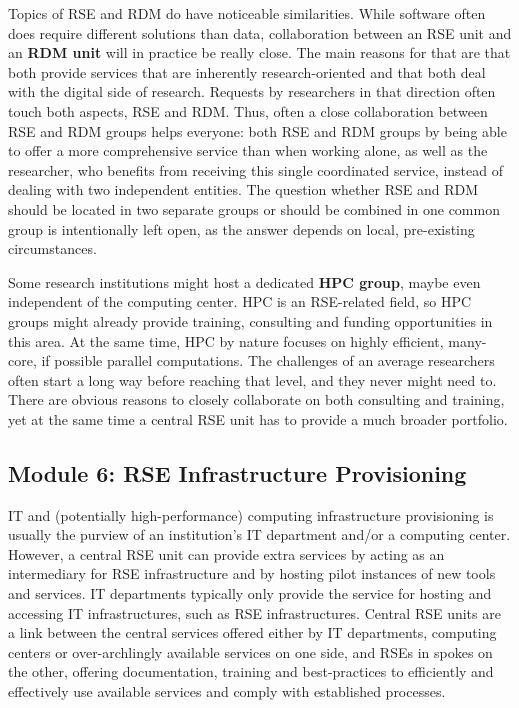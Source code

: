 \documentclass[a4paper]{article}
\begin{document}
Topics of RSE and RDM do have noticeable similarities.
While software often does require different solutions than data, collaboration between an RSE unit and an \textbf{RDM unit} will in practice be really close.
The main reasons for that are that both provide services that are inherently research-oriented and that both deal with the digital side of research.
Requests by researchers in that direction often touch both aspects, RSE and RDM\@.
Thus, often a close collaboration between RSE and RDM groups helps everyone: both RSE and RDM groups by being able to offer a more comprehensive service than when working alone, as well as the researcher, who benefits from receiving this single coordinated service, instead of dealing with two independent entities.
The question whether RSE and RDM should be located in two separate groups or should be combined in one common group is intentionally left open, as the answer depends on local, pre-existing circumstances.

Some research institutions might host a dedicated \textbf{HPC group}, maybe even independent of the computing center.
HPC is an RSE-related field, so HPC groups might already provide training, consulting and funding opportunities in this area.
At the same time, HPC by nature focuses on highly efficient, many-core, if possible parallel computations.
The challenges of an average researchers often start a long way before reaching that level, and they never might need to.
There are obvious reasons to closely collaborate on both consulting and training, yet at the same time a central RSE unit has to provide a much broader portfolio.

\subsection{Module 6: RSE Infrastructure Provisioning}%
\label{sec:infrastructure}

IT and (potentially high-performance) computing infrastructure provisioning is usually the purview of an institution's IT department and/or a computing center.
However, a central RSE unit can provide extra services by acting as an intermediary for RSE infrastructure and by hosting pilot instances of new tools and services.
IT departments typically only provide the service for hosting and accessing IT infrastructures, such as RSE infrastructures.
Central RSE units are a link between the central services offered either by IT departments, computing centers or over-archlingly available services on one side,
and RSEs in spokes on the other, offering documentation, training and best-practices to efficiently and effectively use available services and comply with established processes.
\end{document}
